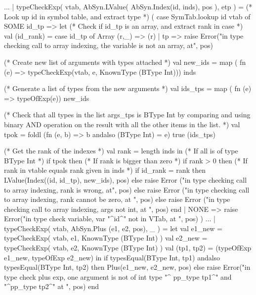 \documentclass[10pt]{article}
\begin{document}
\begin{fancycode}[frame=lines,fontsize=\scriptsize,label=\textit{edited code - SRC/Type.sml}]
...
 | typeCheckExp( vtab, AbSyn.LValue( AbSyn.Index(id, inds), pos ), etp ) =
     (* Look up id in symbol table, and extract type *)
     ( case SymTab.lookup id vtab of
         SOME id_tp =>
             let
                 (* Check if id_tp is an array, and extract rank in case *)
                 val (id_rank) = case id_tp of
                     Array (r,_) => (r)
                     | tp      => raise Error("in type checking call to array indexing, the variable is not an array, at", pos)
               
                 (* Create new list of arguments with types attached *)
                 val new_ids = map ( fn (e) => typeCheckExp(vtab, e, KnownType (BType Int))) inds

                 (* Generate a list of types from the new arguments *)
                 val ids_tps = map ( fn (e) => typeOfExp(e)) new_ids

                 (* Check that all types in the list args_tps is BType Int by
                 comparing and using binary AND operation on the result with
                 all the other items in the list. *)
                 val tpok = foldl (fn (e, b) => b andalso (BType Int) = e) true
                                  (ids_tps)

                 (* Get the rank of the indexes *)
                 val rank = length inds
             in
                 (* If all is of type BType Int *)
                 if tpok then
                     (* If rank is bigger than zero *)
                     if rank > 0 then
                         (* If rank in vtable equals rank given in inds *)
                         if id_rank = rank then
                             LValue(Index((id, id_tp), new_ids), pos)
                         else raise Error ("in type checking call to array indexing, rank is wrong, at", pos)
                     else raise Error ("in type checking call to array indexing, rank cannot be zero, at ", pos)
                 else raise Error ("in type checking call to array indexing, args not int, at ", pos)
             end
         | NONE    => raise Error("in type check variable, var "^id^" not in VTab, at ", pos)
     )
...
 | typeCheckExp( vtab, AbSyn.Plus (e1, e2, pos), _ ) =
     let val e1_new = typeCheckExp( vtab, e1, KnownType (BType Int) )
         val e2_new = typeCheckExp( vtab, e2, KnownType (BType Int) )
         val (tp1, tp2) = (typeOfExp e1_new, typeOfExp e2_new)
     in  if  typesEqual(BType Int, tp1) andalso typesEqual(BType Int, tp2)
         then Plus(e1_new, e2_new, pos)
         else raise Error("in type check plus exp, one argument is not of int type "^
                          pp_type tp1^" and "^pp_type tp2^" at ", pos)
     end


\end{fancycode}
\end{document}
